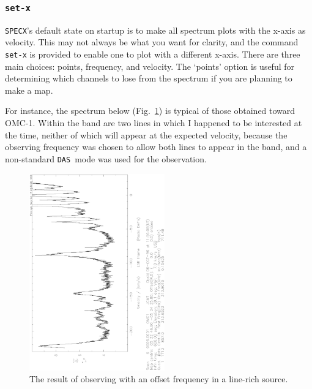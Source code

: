 \documentclass[11pt,twoside]{article}
\newcommand{\SPECX}{{\tt SPECX}}
\newcommand{\das}{{\tt DAS}}
\begin{document}
\subsubsection{{\tt set-x}}
\label{sec:set-x}
\SPECX 's default state on startup is to make all spectrum plots with
the x-axis as velocity. This may not always be what you want for
clarity, and the command {\tt set-x} is provided to enable one to plot
with a different x-axis. There are three main choices: points,
frequency, and velocity. The `points' option is useful for determining
which channels to lose from the spectrum if you are planning to make a
map. 

For instance, the spectrum below (Fig.~\ref{fig:set-x-orig}) 
is typical of those obtained toward
OMC-1. Within the band are two lines in which I happened to be
interested at the time, neither of which will appear at the expected
velocity, because the observing frequency was chosen to allow both
lines to appear in the band, and a non-standard \das\ mode was used
for the observation.

\begin{figure}[ht]
\begin{minipage}[t]{\textwidth}
\begin{minipage}[b]{0.5\textwidth}
\centering
\includegraphics[angle=-90,width=2.3in]{sc8_hdo-orig.ps}
\end{minipage}
\hfill
\begin{minipage}[b]{0.45\textwidth}
\caption[A messy spectrum]
{\small{The result of observing with an offset frequency in a
line-rich source.
\vspace*{2cm}
}}
\label{fig:set-x-orig}
\end{minipage}
\end{minipage}
\end{figure}
\end{document}

